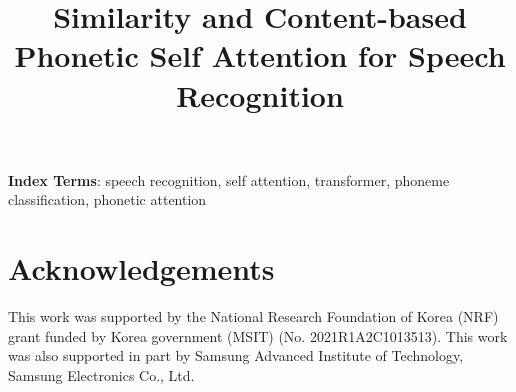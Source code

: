 \documentclass[a4paper]{article}
\title{Similarity and Content-based Phonetic Self Attention for Speech Recognition}
\begin{document}
\maketitle

\begin{abstract}

\end{abstract}
\noindent\textbf{Index Terms}: speech recognition, self attention, transformer, phoneme classification, phonetic attention







\section{Acknowledgements}
This work was supported by the National Research Foundation of Korea (NRF) grant funded by Korea government (MSIT) (No. 2021R1A2C1013513). This work was also supported in part by Samsung Advanced Institute of Technology, Samsung Electronics Co., Ltd.

\newpage


\end{document}
